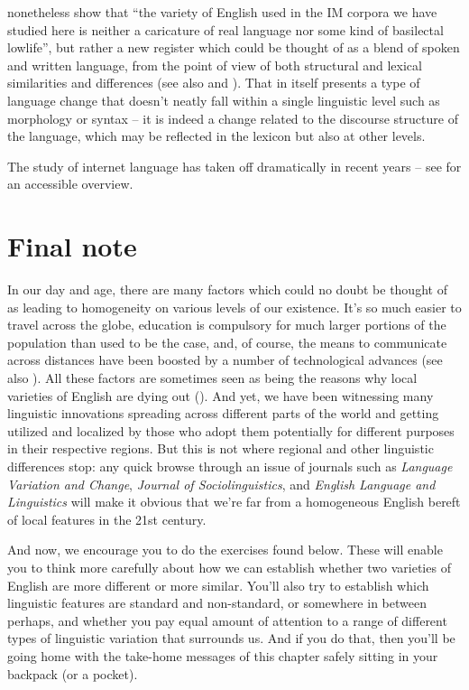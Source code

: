 \citet[25]{TagliamonteDenis2008} nonetheless show that ``the variety of English used in the IM corpora we have studied here is neither a caricature of real language nor some kind of basilectal lowlife'', but rather a new register which could be thought of as a blend of spoken and written language, from the point of view of both structural and lexical similarities and differences (see also \citealp{Baron2008} and \citealp{BiberConrad2019}). That in itself presents a type of language change that doesn't neatly fall within a single linguistic level such as morphology or syntax -- it is indeed a change related to the discourse structure of the language, which may be reflected in the lexicon but also at other levels.

The study of internet language has taken off dramatically in recent years -- see \citet{McCulloch2019} for an accessible overview.

\section{Final note}
In our day and age, there are many factors which could no doubt be thought of as leading to homogeneity on various levels of our existence. It's so much easier to travel across the globe, education is compulsory for much larger portions of the population than used to be the case, and, of course, the means to communicate across distances have been boosted by a number of technological advances (see also \citealp[Chapter 1]{Beal2010}). All these factors are sometimes seen as being the reasons why local varieties of English are dying out (\citealp[Chapter 1, pages 1, 3, and 8 in particular]{Beal2010}). And yet, we have been witnessing many linguistic innovations spreading across different parts of the world and getting utilized and localized by those who adopt them potentially for different purposes in their respective regions. But this is not where regional and other linguistic differences stop: any quick browse through an issue of journals such as \textit{Language Variation and Change}, \textit{Journal of Sociolinguistics}, and \textit{English Language and Linguistics} will make it obvious that we're far from a homogeneous English bereft of local features in the 21st century.

And now, we encourage you to do the exercises found below. These will enable you to think more carefully about how we can establish whether two varieties of English are more different or more similar. You'll also try to establish which linguistic features are standard and non-standard, or somewhere in between perhaps, and whether you pay equal amount of attention to a range of different types of linguistic variation that surrounds us. And if you do that, then you'll be going home with the take-home messages of this chapter safely sitting in your backpack (or a pocket).

